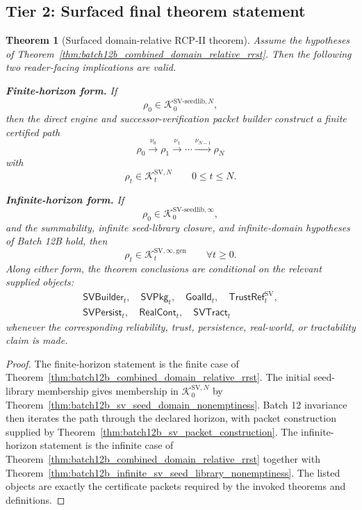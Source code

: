 \documentclass[11pt]{article}
\newtheorem{theorem}{Theorem}[section]
\newcommand{\1}{\mathbf{1}}
\providecommand{\Kcal}{\mathcal{K}}
\begin{document}
\subsection{Tier 2: Surfaced final theorem statement}

\begin{theorem}[Surfaced domain-relative RCP-II theorem]
\label{thm:rcp2_surfaced_domain_relative_theorem}
Assume the hypotheses of Theorem~\ref{thm:batch12b_combined_domain_relative_rrst}. Then the following two reader-facing implications are valid.

\textbf{Finite-horizon form.} If
\[
\rho_0\in\Kcal_0^{\mathrm{SV\mbox{-}seedlib},N},
\]
then the direct engine and successor-verification packet builder construct a finite certified path
\[
\rho_0\xrightarrow{\nu_0}\rho_1\xrightarrow{\nu_1}\cdots\xrightarrow{\nu_{N-1}}\rho_N
\]
with
\[
\rho_t\in\Kcal_t^{\mathrm{SV},N}
\qquad
0\le t\le N.
\]

\textbf{Infinite-horizon form.} If
\[
\rho_0\in\Kcal_0^{\mathrm{SV\mbox{-}seedlib},\infty},
\]
and the summability, infinite seed-library closure, and infinite-domain hypotheses of Batch 12B hold, then
\[
\rho_t\in\Kcal_t^{\mathrm{SV},\infty,\mathrm{gen}}
\qquad
\forall t\ge0.
\]
Along either form, the theorem conclusions are conditional on the relevant supplied objects:
\[
\begin{gathered}
\mathsf{SVBuilder}_t,
\quad
\mathsf{SVPkg}_t,
\quad
\mathsf{GoalId}_t,
\quad
\mathsf{TrustRef}_t^{\mathrm{SV}},\\
\mathsf{SVPersist}_t,
\quad
\mathsf{RealCont}_t,
\quad
\mathsf{SVTract}_t
\end{gathered}
\]
whenever the corresponding reliability, trust, persistence, real-world, or tractability claim is made.
\end{theorem}

\begin{proof}
The finite-horizon statement is the finite case of Theorem~\ref{thm:batch12b_combined_domain_relative_rrst}. The initial seed-library membership gives membership in \(\Kcal_0^{\mathrm{SV},N}\) by Theorem~\ref{thm:batch12b_sv_seed_domain_nonemptiness}. Batch 12 invariance then iterates the path through the declared horizon, with packet construction supplied by Theorem~\ref{thm:batch12b_sv_packet_construction}. The infinite-horizon statement is the infinite case of Theorem~\ref{thm:batch12b_combined_domain_relative_rrst} together with Theorem~\ref{thm:batch12b_infinite_sv_seed_library_nonemptiness}. The listed objects are exactly the certificate packets required by the invoked theorems and definitions.
\end{proof}
\end{document}
